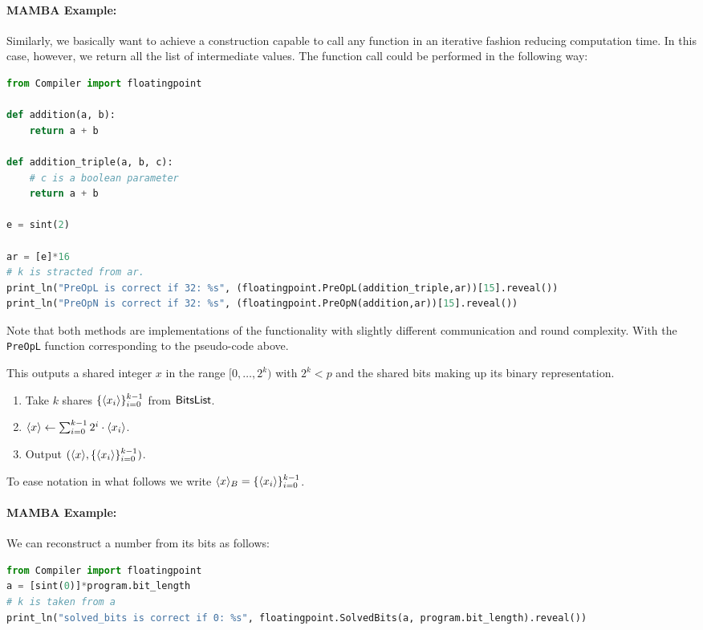 \paragraph{MAMBA Example:} Similarly, we basically want to achieve a construction capable to call any function in an iterative fashion reducing computation time. In this case, however, we return all the list of intermediate values. The function call could be performed in the following way: 
\begin{lstlisting}[language={python}]
from Compiler import floatingpoint

def addition(a, b):
    return a + b

def addition_triple(a, b, c):
	# c is a boolean parameter
    return a + b
    
e = sint(2)

ar = [e]*16
# k is stracted from ar.
print_ln("PreOpL is correct if 32: %s", (floatingpoint.PreOpL(addition_triple,ar))[15].reveal())
print_ln("PreOpN is correct if 32: %s", (floatingpoint.PreOpN(addition,ar))[15].reveal())
\end{lstlisting}
Note that both methods are implementations of the functionality with slightly different  communication and round complexity.
With the \verb+PreOpL+ function corresponding to the pseudo-code above.

This outputs a shared integer $x$ in the range
$[0,\ldots,2^k)$ with $2^k<p$ and the shared bits
making up its binary representation.
\begin{enumerate}
\item Take $k$ shares $\{\langle x_i \rangle\}_{i=0}^{k-1}$ from $\mathsf{BitsList}$.
\item $\langle x \rangle \leftarrow \sum_{i=0}^{k-1} 2^i \cdot \langle x_i \rangle$.
\item Output $(\langle x \rangle, \{\langle x_i \rangle\}_{i=0}^{k-1})$.
\end{enumerate}
To ease notation in what follows we write
$\langle x \rangle_B = \{\langle x_i \rangle\}_{i=0}^{k-1}$.

\paragraph{MAMBA Example:}  We can reconstruct a number from its bits as follows: 
\begin{lstlisting}[language={python}]
from Compiler import floatingpoint
a = [sint(0)]*program.bit_length
# k is taken from a
print_ln("solved_bits is correct if 0: %s", floatingpoint.SolvedBits(a, program.bit_length).reveal())
\end{lstlisting}

